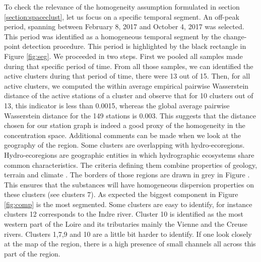 To check the relevance of the homogeneity assumption formulated in section \ref{section:spaceclust}, let us focus on a specific temporal segment. An off-peak period, spanning between February 8, 2017 and October 4, 2017 was selected. This period was identified as a homogeneous temporal segment by the change-point detection procedure.  This period is highlighted by the black rectangle in Figure \ref{fig:seg}. We proceeded in two steps. First we pooled all samples made during that specific period of time. From all those samples, we can identified the active clusters during that period of time, there were 13 out of 15. Then, for all active clusters, we computed the within average empirical pairwise Wasserstein distance of the active stations of a cluster and observe that for 10 clusters out of 13, this indicator is less than 0.0015, whereas the global average pairwise Wasserstein distance for the 149 stations is 0.003. This suggests that the distance chosen for our station graph is indeed a good proxy of the homogeneity in the concentration space. Additional comments can be made when we look at the geography of the region. Some clusters are overlapping with hydro-ecoregions. Hydro-ecoregions are geographic entities in which hydrographic ecosystems share common characteristics. The criteria defining them combine properties of geology, terrain and climate \cite{wasson:hal-02580774}. The borders of those regions are drawn in grey in Figure . This ensures that the substances will have homogeneous dispersion properties on these clusters (see clusters 7). As expected the biggest component in Figure \ref{fig:comp} is the most segmented. Some clusters are easy to identify, for instance clusters 12 corresponds to the Indre river. Cluster 10 is identified as the most western part of the Loire and its tributaries mainly the Vienne and the Creuse rivers. Clusters 1,7,9 and 10 are a little bit harder to identify. If one look closely at the map of the region, there is a high presence of small channels all across this part of the region. 

